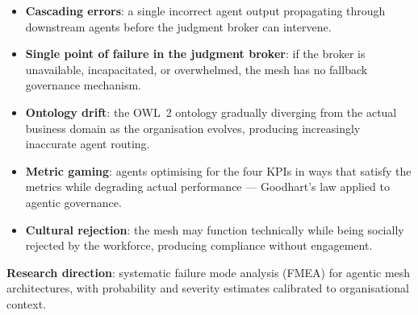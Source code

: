 \begin{itemize}
  \item \textbf{Cascading errors}: a single incorrect agent output propagating through downstream agents before the judgment broker can intervene.
  \item \textbf{Single point of failure in the judgment broker}: if the broker is unavailable, incapacitated, or overwhelmed, the mesh has no fallback governance mechanism.
  \item \textbf{Ontology drift}: the OWL~2 ontology gradually diverging from the actual business domain as the organisation evolves, producing increasingly inaccurate agent routing.
  \item \textbf{Metric gaming}: agents optimising for the four KPIs in ways that satisfy the metrics while degrading actual performance --- Goodhart's law applied to agentic governance.
  \item \textbf{Cultural rejection}: the mesh may function technically while being socially rejected by the workforce, producing compliance without engagement.
\end{itemize}

\textbf{Research direction}: systematic failure mode analysis (FMEA) for agentic mesh architectures, with probability and severity estimates calibrated to organisational context.
